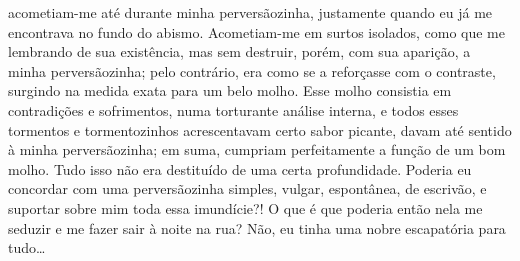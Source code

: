 acometiam-me até durante minha perversãozinha, justamente quando eu já
me encontrava no fundo do abismo. Acometiam-me em surtos isolados, como
que me lembrando de sua existência, mas sem destruir, porém, com sua
aparição, a minha perversãozinha; pelo contrário, era como se a
reforçasse com o contraste, surgindo na medida exata para um belo
molho. Esse molho consistia em contradições e sofrimentos, numa
torturante análise interna, e todos esses tormentos e tormentozinhos
acrescentavam certo sabor picante, davam até sentido à minha
perversãozinha; em suma, cumpriam perfeitamente a função de um bom
molho. Tudo isso não era destituído de uma certa profundidade. Poderia
eu concordar com uma perversãozinha simples, vulgar, espontânea, de
escrivão, e suportar sobre mim toda essa imundície?! O que é que
poderia então nela me seduzir e me fazer sair à noite na rua? Não, eu
tinha uma nobre escapatória para tudo\ldots{}

